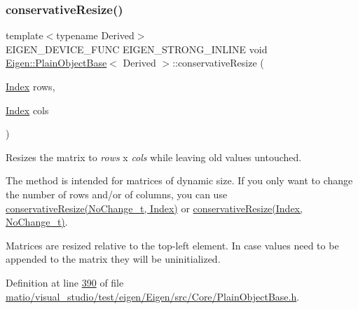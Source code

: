 \subsubsection{\texorpdfstring{conservative\+Resize()}{conservativeResize()}\hspace{0.1cm}{\footnotesize\ttfamily [2/8]}}
{\footnotesize\ttfamily template$<$typename Derived$>$ \\
E\+I\+G\+E\+N\+\_\+\+D\+E\+V\+I\+C\+E\+\_\+\+F\+U\+NC E\+I\+G\+E\+N\+\_\+\+S\+T\+R\+O\+N\+G\+\_\+\+I\+N\+L\+I\+NE void \hyperlink{class_eigen_1_1_plain_object_base}{Eigen\+::\+Plain\+Object\+Base}$<$ Derived $>$\+::conservative\+Resize (\begin{DoxyParamCaption}\item[{\hyperlink{namespace_eigen_a62e77e0933482dafde8fe197d9a2cfde}{Index}}]{rows,  }\item[{\hyperlink{namespace_eigen_a62e77e0933482dafde8fe197d9a2cfde}{Index}}]{cols }\end{DoxyParamCaption})\hspace{0.3cm}{\ttfamily [inline]}}

Resizes the matrix to {\itshape rows} x {\itshape cols} while leaving old values untouched.

The method is intended for matrices of dynamic size. If you only want to change the number of rows and/or of columns, you can use \hyperlink{class_eigen_1_1_plain_object_base_a46afa73816539b0fe36c6e9abd7978a6}{conservative\+Resize(\+No\+Change\+\_\+t, Index)} or \hyperlink{class_eigen_1_1_plain_object_base_a528879aef40f9cbc4ab4925e4a6bceb9}{conservative\+Resize(\+Index, No\+Change\+\_\+t)}.

Matrices are resized relative to the top-\/left element. In case values need to be appended to the matrix they will be uninitialized. 

Definition at line \hyperlink{matio_2visual__studio_2test_2eigen_2_eigen_2src_2_core_2_plain_object_base_8h_source_l00390}{390} of file \hyperlink{matio_2visual__studio_2test_2eigen_2_eigen_2src_2_core_2_plain_object_base_8h_source}{matio/visual\+\_\+studio/test/eigen/\+Eigen/src/\+Core/\+Plain\+Object\+Base.\+h}.

\mbox{\label{class_eigen_1_1_plain_object_base_a528879aef40f9cbc4ab4925e4a6bceb9}} 
